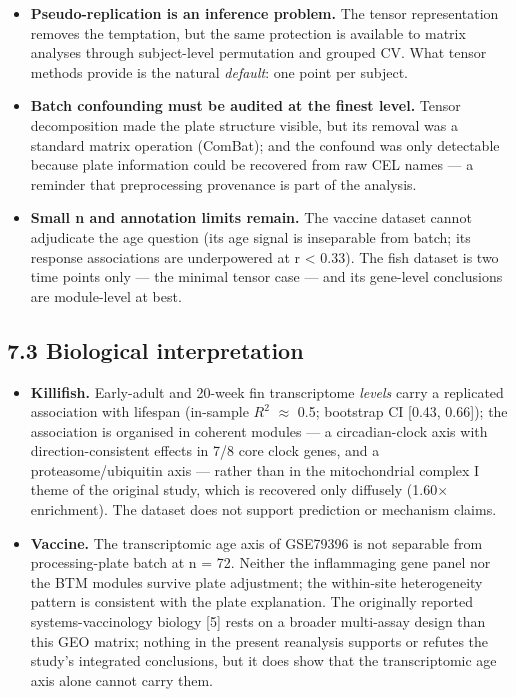 \documentclass[
]{article}
\providecommand{\tightlist}{%
  \setlength{\itemsep}{0pt}\setlength{\parskip}{0pt}}
\begin{document}
\begin{itemize}
\tightlist
\item
  \textbf{Pseudo-replication is an inference problem.} The tensor
  representation removes the temptation, but the same protection is
  available to matrix analyses through subject-level permutation and
  grouped CV. What tensor methods provide is the natural \emph{default}:
  one point per subject.
\item
  \textbf{Batch confounding must be audited at the finest level.} Tensor
  decomposition made the plate structure visible, but its removal was a
  standard matrix operation (ComBat); and the confound was only
  detectable because plate information could be recovered from raw CEL
  names --- a reminder that preprocessing provenance is part of the
  analysis.
\item
  \textbf{Small n and annotation limits remain.} The vaccine dataset
  cannot adjudicate the age question (its age signal is inseparable from
  batch; its response associations are underpowered at
  \textbar r\textbar{} \textless{} 0.33). The fish dataset is two time
  points only --- the minimal tensor case --- and its gene-level
  conclusions are module-level at best.
\end{itemize}

\subsection{7.3 Biological
interpretation}\label{biological-interpretation}

\begin{itemize}
\tightlist
\item
  \textbf{Killifish.} Early-adult and 20-week fin transcriptome
  \emph{levels} carry a replicated association with lifespan (in-sample
  \(R^2\) \(\approx\) 0.5; bootstrap CI {[}0.43, 0.66{]}); the
  association is organised in coherent modules --- a circadian-clock
  axis with direction-consistent effects in 7/8 core clock genes, and a
  proteasome/ubiquitin axis --- rather than in the mitochondrial complex
  I theme of the original study, which is recovered only diffusely
  (1.60\(\times\) enrichment). The dataset does not support prediction
  or mechanism claims.
\item
  \textbf{Vaccine.} The transcriptomic age axis of GSE79396 is not
  separable from processing-plate batch at n = 72. Neither the
  inflammaging gene panel nor the BTM modules survive plate adjustment;
  the within-site heterogeneity pattern is consistent with the plate
  explanation. The originally reported systems-vaccinology biology
  {[}5{]} rests on a broader multi-assay design than this GEO matrix;
  nothing in the present reanalysis supports or refutes the study's
  integrated conclusions, but it does show that the transcriptomic age
  axis alone cannot carry them.
\end{itemize}
\end{document}
